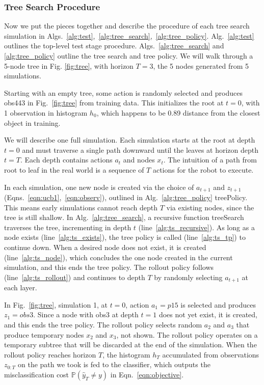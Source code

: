 \documentclass[letterpaper, 10 pt, conference]{ieeeconf}  %
\begin{document}
\subsubsection{Tree Search Procedure}
\label{sec:tree_procedure}

Now we put the pieces together and describe the procedure of each tree search simulation in Algs.~\ref{alg:test},~\ref{alg:tree_search},~\ref{alg:tree_policy}.
Alg.~\ref{alg:test} outlines the top-level test stage procedure.
Algs.~\ref{alg:tree_search} and \ref{alg:tree_policy} outline the tree search and tree policy.
We will walk through a 5-node tree in Fig. \ref{fig:tree}, with horizon $T=3$, the 5 nodes generated from 5 simulations.

Starting with an empty tree, some action is randomly selected and produces obs443 in Fig.~\ref{fig:tree} from training data. This initializes the root at $t=0$, with 1 observation in histogram $h_0$, which happens to be 0.89 distance from the closest object in training.

We will describe one full simulation.
Each simulation starts at the root at depth $t=0$ and must traverse a single path downward until the leaves at horizon depth $t=T$. Each depth contains actions $a_t$ and nodes $x_t$.
The intuition of a path from root to leaf in the real world is a sequence of $T$ actions for the robot to execute.

In each simulation, one new node is created via the choice of $a_{t+1}$ and $z_{t+1}$ (Eqns.~\ref{eqn:ucb1},~\ref{eqn:observ}), outlined in Alg.~\ref{alg:tree_policy} treePolicy.
This means early simulations cannot reach depth $T$ via existing nodes, since the tree is still shallow.
In Alg.~\ref{alg:tree_search}, a recursive function treeSearch traverses the tree, incrementing in depth $t$ (line~\ref{alg:ts_recursive}).
As long as a node exists (line~\ref{alg:ts_exists}), the tree policy is called (line~\ref{alg:ts_tp}) to continue down.
%
When a desired node does not exist, it is created (line~\ref{alg:ts_node}), which concludes the one node created in the current simulation, and this ends the tree policy. The rollout policy follows (line~\ref{alg:ts_rollout}) and continues to depth $T$ by randomly selecting $a_{t+1}$ at each layer.

In Fig.~\ref{fig:tree}, simulation 1, at $t=0$, action $a_1=p15$ is selected and produces $z_1=obs3$. Since a node with obs3 at depth $t=1$ does not yet exist, it is created, and this ends the tree policy. The rollout policy selects random $a_2$ and $a_3$ that produce temporary nodes $x_2$ and $x_3$, not shown. The rollout policy operates on a temporary subtree that will be discarded at the end of the simulation.
%
When the rollout policy reaches horizon $T$, the histogram $h_T$ accumulated from observations $z_{0:T}$ on the path we took is fed to the classifier, which outputs the misclassification cost $\mathbb{P}(\hat{y}_T \neq y)$ in Eqn.~\ref{eqn:objective}.
\end{document}
